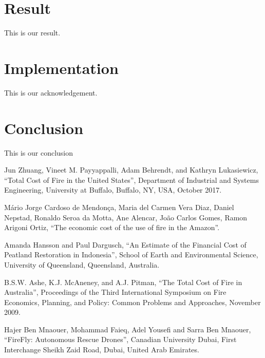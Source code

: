 \documentclass[conference]{IEEEtran}
\begin{document}
\section*{Result}

This is our result.

\section*{Implementation}

This is our acknowledgement.

\section*{Conclusion}

This is our conclusion


\begin{thebibliography}{00}
 Jun Zhuang, Vineet M. Payyappalli, Adam Behrendt,
and Kathryn Lukasiewicz, ``Total Cost of Fire in the United States'', Department of Industrial and Systems Engineering, University at Buffalo, Buffalo, NY, USA, October 2017.

 Mário Jorge Cardoso de Mendonça, Maria del Carmen Vera Diaz,
Daniel Nepstad, Ronaldo Seroa da Motta, Ane Alencar, João Carlos Gomes, Ramon Arigoni Ortiz, ``The economic cost of the use of fire in the Amazon''.

 Amanda Hansson and Paul Dargusch, ``An Estimate of the Financial Cost of Peatland Restoration in Indonesia'', School of Earth and Environmental Science, University of Queensland, Queensland, Australia.

 B.S.W. Ashe, K.J. McAneney, and A.J. Pitman, ``The Total Cost of Fire in Australia'', Proceedings of the Third International Symposium on Fire Economics, Planning, and Policy: Common Problems and Approaches, November 2009.

 Hajer Ben Mnaouer, Mohammad Faieq, Adel Yousefi and Sarra Ben Mnaouer, ``FireFly: Autonomous Rescue Drones'', Canadian University Dubai, First Interchange Sheikh Zaid Road, Dubai, United Arab Emirates.





\end{thebibliography}
\end{document}
